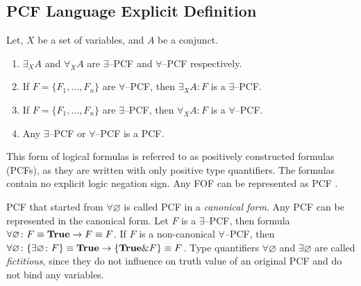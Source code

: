 \documentclass[a4paper,12pt]{article}
\begin{document}
\subsection{PCF Language Explicit Definition}

\begin{definition}
\label{def:pcf}
Let, $X$ be a set of variables, and $A$ be a conjunct.
\begin{enumerate}

\item $\exists_XA$ and $\forall_XA$ are $\exists$--PCF and $\forall$--PCF respectively.

\item If $F = \{F_1,\ldots,F_n\}$ are $\forall$--PCF, then $\exists_XA\colon F$ is a $\exists$--PCF.

\item If $F = \{F_1,\ldots,F_n\}$ are $\exists$--PCF, then $\forall_XA\colon F$ is a $\forall$--PCF.

\item Any $\exists$--PCF or $\forall$--PCF is a PCF.
\end{enumerate}
\end{definition}

This form of logical formulas is referred to as positively constructed formulas (PCFs), as they are written with only positive type quantifiers. The formulas contain no explicit logic negation sign. Any FOF can be represented as PCF \cite{ICDS2000}.

PCF that started from $\forall \varnothing$ is called PCF in a {\em canonical form}. Any PCF can be represented in the canonical form. Let $F$ is a $\exists$--PCF, then formula
$\forall \varnothing\colon F \equiv \text{\textbf{True}} \rightarrow F \equiv F$. If $F$ is a non-canonical $\forall$--PCF, then $\forall \varnothing\colon\{\exists \varnothing\colon F\} \equiv \text{\textbf{True}} \rightarrow \{\text{\textbf{True}}\&F\} \equiv F$. Type quantifiers $\forall \varnothing$ and $\exists \varnothing$ are called {\em fictitious}, since they do not influence on truth value of an original PCF and do not bind any variables.  %
\end{document}
